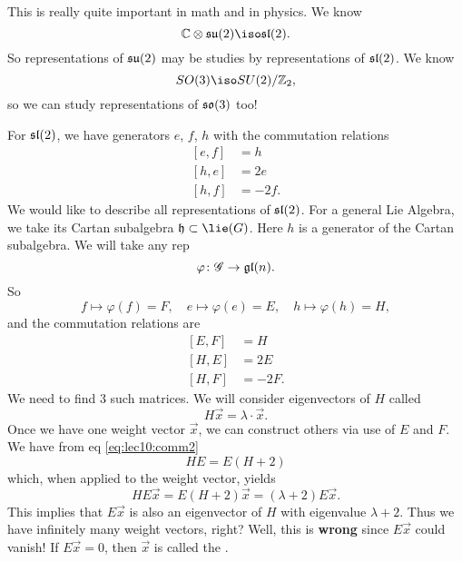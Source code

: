 This is really quite important in math and in physics. We know
\begin{equation}
\Bbb{C}\otimes\frak{su}(2)\iso\frak{sl}(2).
\end{equation}
So representations of $\frak{su}(2)$ may be studies by
representations of $\frak{sl}(2)$. We know
\begin{equation}
SO(3)\iso SU(2)/\Bbb{Z}_{2},
\end{equation}
so we can study representations of $\frak{so}(3)$ too!

For $\frak{sl}(2)$, we have generators $e$, $f$, $h$ with the
commutation relations
\begin{subequations}
\begin{align}
[e,f]&=h\\
[h,e]&=2e\\
[h,f]&=-2f.
\end{align}
\end{subequations}
We would like to describe all representations of
$\frak{sl}(2)$. For a general Lie Algebra, we take its Cartan
subalgebra $\frak{h}\subset\lie(G)$. Here $h$ is a generator of
the Cartan subalgebra. We will take any rep
\begin{equation}
\varphi\colon\mathscr{G}\to\frak{gl}(n).
\end{equation}
So
\begin{equation}
f\mapsto\varphi(f)=F,\quad
e\mapsto\varphi(e)=E,\quad
h\mapsto\varphi(h)=H,
\end{equation}
and the commutation relations are
\begin{subequations}
\begin{align}
[E,F]&=H\label{eq:lec10:comm1}\\
[H,E]&=2E\label{eq:lec10:comm2} \\
[H,F]&=-2F.\label{eq:lec10:comm3}
\end{align}
\end{subequations}
We need to find 3 such matrices. We will consider eigenvectors of
$H$ called 
\begin{equation}
H\vec{x}=\lambda\cdot\vec{x}.
\end{equation}
Once we have one weight vector $\vec{x}$, we can construct others
via use of $E$ and $F$. We have from eq \eqref{eq:lec10:comm2}
\begin{equation}
HE=E(H+2)
\end{equation}
which, when applied to the weight vector, yields
\begin{equation}
HE\vec{x}=E(H+2)\vec{x}=(\lambda+2)E\vec{x}.
\end{equation}
This implies that $E\vec{x}$ is also an eigenvector of $H$ with
eigenvalue $\lambda+2$. Thus we have infinitely many weight
vectors, right? Well, this is {\bf wrong} since $E\vec{x}$ could
vanish! If $E\vec{x}=0$, then $\vec{x}$ is called the
.

